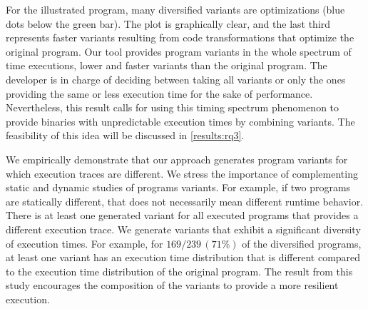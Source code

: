 For the illustrated program, many diversified variants are optimizations (blue dots below the green bar). The plot is graphically clear, and the last third represents faster variants resulting from code transformations that optimize the original program.
Our tool provides program variants in the whole spectrum of time executions, lower and faster variants than the original program. The developer is in charge of deciding between taking all variants or only the ones providing the same or less execution time for the sake of performance. Nevertheless, this result calls for using this timing spectrum phenomenon to provide binaries with unpredictable execution times by combining variants. The feasibility of this idea will be discussed in \autoref{results:rq3}.


\begin{tcolorbox}[title=Answer to RQ2.,boxrule=2pt,arc=.3em,boxsep=1.5mm]
    We empirically demonstrate that our approach generates program variants for which execution traces are different. We stress the importance of complementing static and dynamic studies of programs variants. For example, if two programs are statically different, that does not necessarily mean different runtime behavior. There is at least one generated variant for all executed programs that provides a different execution trace. 
    We generate variants that exhibit a significant diversity of execution times. For example, for $169/239\,(71\%)$ of the diversified programs, at least one variant has an execution time distribution that is different compared to the execution time distribution of the original program. 
    The result from this study encourages the composition of the variants to provide a more resilient execution.
\end{tcolorbox}